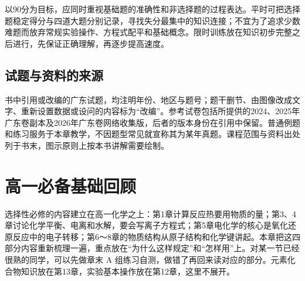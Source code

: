 \documentclass[UTF8,a4paper,zihao=5,oneside,openany,fontset=none]{ctexbook}
\begin{document}
以90分为目标，应同时重视基础题的准确性和非选择题的过程表达。平时可把选择题稳定得分与四道大题分别记录，寻找失分最集中的知识连接；不宜为了追求少数难题而放弃常规实验操作、方程式配平和基础概念。限时训练放在知识初步完整之后进行，先保证正确理解，再逐步提高速度。

\section*{试题与资料的来源}
书中引用或改编的广东试题，均注明年份、地区与题号；题干删节、由图像改成文字、重新设置数据或设问的内容标为“改编”。参考试卷包括所提供的2024、2025年广东卷副本及2026年广东卷网络收集版，后者的版本身份在引用中保留。普通例题和练习服务于本章教学，不因题型常见就宣称其为某年真题。课程范围与资料出处列于书末，图示原则上按本书讲解需要绘制。
\setcounter{tocdepth}{1}
\tableofcontents

\mainmatter
\setcounter{chapter}{-1}
\newcommand{\czeroSide}[4]{%
  \ifcase#1\relax
  \or \fill (#2,#3) circle (0.028);
  \or \if#4h\fill ({#2-0.065},#3) circle (0.028) ({#2+0.065},#3) circle (0.028);%
      \else\fill (#2,{#3-0.065}) circle (0.028) (#2,{#3+0.065}) circle (0.028);\fi
  \or \node[inner sep=0pt,font=\scriptsize] at (#2,#3) {$\times$};
  \fi}
\newcommand{\czeroAt}[7]{%
  \node[inner sep=0pt] at (#1,#2) {#3};
  \czeroSide{#4}{#1}{#2+0.25}{h}\czeroSide{#5}{#1+0.28}{#2}{v}%
  \czeroSide{#6}{#1}{#2-0.25}{h}\czeroSide{#7}{#1-0.28}{#2}{v}}
\newcommand{\czeroBr}[3]{%
  \draw (#1+0.07,0.38)--(#1,0.38)--(#1,-0.38)--(#1+0.07,-0.38);
  \draw (#2-0.07,0.38)--(#2,0.38)--(#2,-0.38)--(#2-0.07,-0.38);
  \node[anchor=west,inner sep=1pt,font=\scriptsize] at (#2,0.42) {#3};}

\chapter{高一必备基础回顾}

选择性必修的内容建立在高一化学之上：第1章计算反应热要用物质的量；第3、4章讨论化学平衡、电离和水解，要会写离子方程式；第5章电化学的核心是氧化还原反应中的电子转移；第6～8章的物质结构从原子结构和化学键讲起。本章把这四部分内容重新梳理一遍，重点放在“为什么这样规定”和“怎样用”上。对某一节已经很熟的同学，可以先做章末 A 组练习自测，做错了再回来读对应的部分。元素化合物知识放在第13章，实验基本操作放在第12章，这里不展开。
\end{document}
